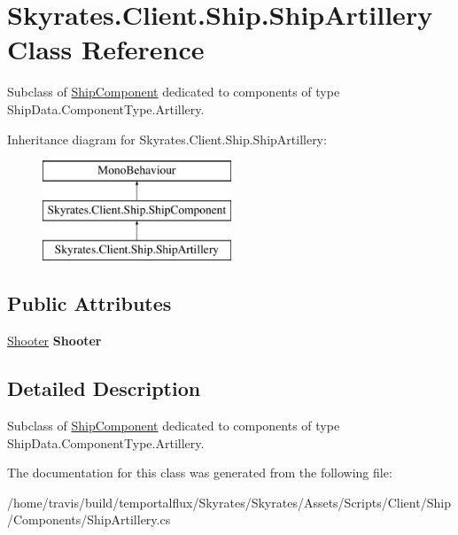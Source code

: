 \hypertarget{class_skyrates_1_1_client_1_1_ship_1_1_ship_artillery}{\section{Skyrates.\-Client.\-Ship.\-Ship\-Artillery Class Reference}
\label{class_skyrates_1_1_client_1_1_ship_1_1_ship_artillery}
}


Subclass of \hyperlink{class_skyrates_1_1_client_1_1_ship_1_1_ship_component}{Ship\-Component} dedicated to components of type Ship\-Data.\-Component\-Type.\-Artillery.  


Inheritance diagram for Skyrates.\-Client.\-Ship.\-Ship\-Artillery\-:\begin{figure}[H]
\begin{center}
\leavevmode
\includegraphics[height=3.000000cm]{class_skyrates_1_1_client_1_1_ship_1_1_ship_artillery}
\end{center}
\end{figure}
\subsection*{Public Attributes}
\begin{DoxyCompactItemize}
\item 
\hypertarget{class_skyrates_1_1_client_1_1_ship_1_1_ship_artillery_a9a605ca4a856e0f7000efac4b8442f77}{\hyperlink{class_skyrates_1_1_client_1_1_mono_1_1_shooter}{Shooter} {\bfseries Shooter}}\label{class_skyrates_1_1_client_1_1_ship_1_1_ship_artillery_a9a605ca4a856e0f7000efac4b8442f77}

\end{DoxyCompactItemize}


\subsection{Detailed Description}
Subclass of \hyperlink{class_skyrates_1_1_client_1_1_ship_1_1_ship_component}{Ship\-Component} dedicated to components of type Ship\-Data.\-Component\-Type.\-Artillery. 



The documentation for this class was generated from the following file\-:\begin{DoxyCompactItemize}
\item 
/home/travis/build/temportalflux/\-Skyrates/\-Skyrates/\-Assets/\-Scripts/\-Client/\-Ship/\-Components/Ship\-Artillery.\-cs\end{DoxyCompactItemize}
